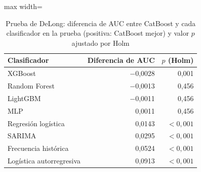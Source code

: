 \begin{table}[htbp]\centering\small
\caption{Prueba de DeLong: diferencia de AUC entre CatBoost y cada clasificador en la prueba (positiva: CatBoost mejor) y valor $p$ ajustado por Holm}\label{tab:delong}
\begin{adjustbox}{max width=\textwidth}\begin{tabular}{lrr}\toprule
Clasificador & Diferencia de AUC & $p$ (Holm)\\ \midrule
XGBoost & \ensuremath{-}0{,}0028 & 0{,}001 \\
Random Forest & \ensuremath{-}0{,}0013 & 0{,}456 \\
LightGBM & \ensuremath{-}0{,}0011 & 0{,}456 \\
MLP & 0{,}0011 & 0{,}456 \\
Regresión logística & 0{,}0143 & $<0{,}001$ \\
SARIMA & 0{,}0295 & $<0{,}001$ \\
Frecuencia histórica & 0{,}0524 & $<0{,}001$ \\
Logística autorregresiva & 0{,}0913 & $<0{,}001$ \\
\bottomrule\end{tabular}\end{adjustbox}\end{table}
